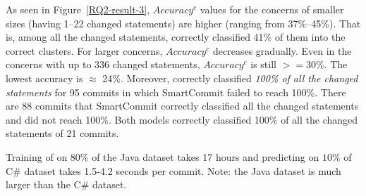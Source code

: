 
	

\vspace{2pt}
 As seen in
Figure~\ref{RQ2-result-3}, $Accuracy^{c}$ values for the concerns of
smaller sizes (having 1--22 changed statements) are higher (ranging
from 37\%--45\%). That is, among all the changed statements, {\tool}
correctly classified 41\% of them into the correct clusters. 
For larger concerns, $Accuracy^{c}$ decreases gradually. Even in
the concerns with up to 336 changed statements, $Accuracy^{c}$ is
still $>=$30\%. The lowest accuracy is $\approx$ 24\%. Moreover,
{\tool} correctly classified {\em 100\% of all the changed statements}
for 95 commits in which SmartCommit failed to reach 100\%. There are 88
commits that SmartCommit correctly classified all the changed statements
and {\tool} did not reach 100\%. Both models correctly classified
100\% of all the changed statements of 21 commits.


Training of \tool on $80\%$ of the Java dataset takes 17 hours and
predicting on $10\%$ of C\# dataset takes 1.5-4.2 seconds per commit.
Note: the Java dataset is much larger than the C\# dataset.
